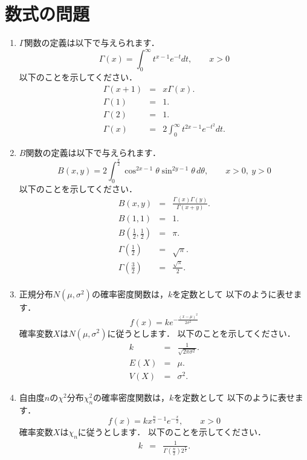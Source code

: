 \documentclass[12pt]{ltjsarticle}
\begin{document}
\section{数式の問題}
\begin{enumerate}
\item
$\Gamma$関数の定義は以下で与えられます．
\[
\Gamma\left(x\right)=\int_0^\infty t^{x-1}e^{-t}dt,\qquad
x>0
\]
以下のことを示してください．
\begin{eqnarray*}
\Gamma\left(x+1\right)&=&x\Gamma\left(x\right). \\
\Gamma\left(1\right)&=&1. \\
\Gamma\left(2\right)&=&1. \\
\Gamma\left(x\right)&=&2\int_0^\infty t^{2x-1}e^{-t^2}dt.
\end{eqnarray*}
\item
$B$関数の定義は以下で与えられます．
\[
B\left(x,y\right)=2\int_0^\frac{\pi}{2}
\cos^{2x-1}\theta\sin^{2y-1}\theta\,d\theta,\qquad
x>0,\ y>0
\]
以下のことを示してください．
\begin{eqnarray*}
B\left(x,y\right)&=&
\frac{\Gamma\left(x\right)\Gamma\left(y\right)}{\Gamma\left(x+y\right)}. \\
B\left(1,1\right)&=&1. \\
B\left(\frac{1}{2},\frac{1}{2}\right)&=&\pi. \\
\Gamma\left(\frac{1}{2}\right)&=&\sqrt{\pi}. \\
\Gamma\left(\frac{3}{2}\right)&=&\frac{\sqrt{\pi}}{2}. \\
\end{eqnarray*}
\item
正規分布$N\left(\mu,\sigma^2\right)$の確率密度関数は，$k$を定数として
以下のように表せます．
\[
f\left(x\right)=ke^{-\frac{\left(x-\mu\right)^2}{2\sigma^2}}
\]
確率変数$X$は$N\left(\mu,\sigma^2\right)$に従うとします．
以下のことを示してください．
\begin{eqnarray*}
k&=&\frac{1}{\sqrt{2\pi\sigma^2}}. \\
E\left(X\right)&=&\mu. \\
V\left(X\right)&=&\sigma^2.
\end{eqnarray*}
\item
自由度$n$の$\chi^2$分布$\chi_n^2$の確率密度関数は，$k$を定数として
以下のように表せます．
\[
f\left(x\right)=kx^{\frac{n}{2}-1}e^{-\frac{x}{2}},\qquad
x>0
\]
確率変数$X$は$\chi_n$に従うとします．
以下のことを示してください．
\begin{eqnarray*}
k&=&\frac{1}{\Gamma\left(\frac{n}{2}\right)2^{\frac{n}{2}}}. \\

\end{eqnarray*}
\end{enumerate}
\end{document}

